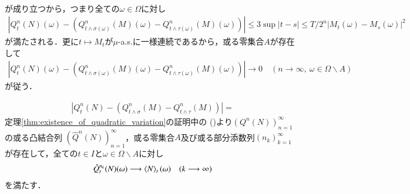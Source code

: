 \begin{prf}
\begin{description}
\begin{align}
				\end{align}
				が成り立つから，つまり全ての$\omega \in \Omega$に対し
				\begin{align}
					\left| Q^n_t(N)(\omega) - \left( Q^n_{t\wedge\sigma(\omega)}(M)(\omega) - Q^n_{t\wedge\tau(\omega)}(M)(\omega) \right) \right|
					\leq 3 \sup{|t - s| \leq T/2^n}{|M_t(\omega) - M_s(\omega)|^2}
				\end{align}
				が満たされる．更に$t \longmapsto M_t$が$\mu$-a.s.に一様連続であるから，或る零集合$A$が存在して
				\begin{align}
					\left| Q^n_t(N)(\omega) - \left( Q^n_{t\wedge\sigma(\omega)}(M)(\omega) - Q^n_{t\wedge\tau(\omega)}(M)(\omega) \right) \right|
					\longrightarrow 0 \quad (n \longrightarrow \infty,\ \omega \in \Omega \backslash A)
				\end{align}
				が従う．
				
				\begin{align}
					\left| Q^n_t(N) - \left( Q^n_{t\wedge\sigma}(M) - Q^n_{t\wedge\tau}(M) \right) \right|
					= 
				\end{align}
				定理\ref{thm:existence_of_quadratic_variation}の証明中の
				()より$\left( Q^n(N) \right)_{n=1}^{\infty}$の或る凸結合列
				$\left( \hat{Q}^n(N) \right)_{n=1}^{\infty}$，或る零集合$A$及び或る部分添数列$(n_k)_{k=1}^{\infty}$
				が存在して，全ての$t \in I$と$\omega \in \Omega \backslash A$に対し
				\begin{align}
					\hat{Q}^{n_k}_t(N)(\omega) \longrightarrow \inprod<N>_t(\omega) \quad (k \longrightarrow \infty)
				\end{align}
				を満たす．
		\end{description}
	\end{prf}